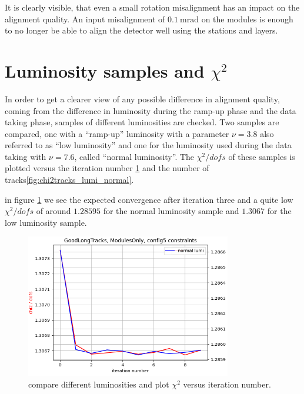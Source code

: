 It is clearly visible, that even a small rotation misalignment has an impact on the alignment quality. An input misalignment of $\SI{0.1}{\milli\radian}$ on the modules is enough to no longer be able to align the detector well using the stations and layers.

\section{Luminosity samples and \texorpdfstring{$\chi^2$}{chi2}}
In order to get a clearer view of any possible difference in alignment quality, coming from the difference in luminosity during the ramp-up phase and the data taking phase, samples of different luminosities are checked.
Two samples are compared, one with a ``ramp-up'' luminosity with a parameter $\nu = 3.8$ also referred to as ``low luminosity'' and one for the luminosity used during the data taking
with $\nu = 7.6$, called ``normal luminosity''.
The $\chi^2 / dofs$ of these samples is plotted versus the iteration number \ref{fig:chi2iter_lumi_normal} and the number of tracks\ref{fig:chi2tracks_lumi_normal}.

in figure \ref{fig:chi2iter_lumi_normal} we see the expected convergence after iteration three and a quite low $\chi^2 / dofs$ of around $\num{1.28595}$ for the normal luminosity sample
and $\num{1.3067}$ for the low luminosity sample.

\begin{figure}
  \centering
  \includegraphics[width=0.8\textwidth]{plots/renewed_plots/modules_chi2_c5.png}
  \caption{compare different luminosities and plot $\chi^2$ versus iteration number.}
  \label{fig:chi2iter_lumi_normal}
\end{figure}

